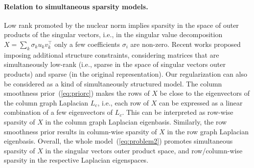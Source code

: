 \documentclass{article}
\begin{document}
\paragraph{Relation to simultaneous sparsity models.}
Low rank promoted by the nuclear norm implies sparsity in the space of outer products of the singular vectors, i.e., in the singular value decomposition $X  =  \sum_{k} \sigma_k u_k v_k^\top$ only a few coefficients $\sigma_i$ are non-zero. Recent works \cite{oymak2012simultaneously} proposed imposing additional structure constraints, considering matrices that are simultaneously low-rank (i.e., sparse in the space of singular vectors outer products) and sparse (in the original representation). Our regularization can also be considered as a kind of simultaneously structured model. The column smoothness prior~(\ref{eq:priorc}) makes the rows of $X$ be close to the eigenvectors of the column graph Laplacian $L_c$, i.e., each row of $X$ can be expressed as a linear combination of a few eigenvectors of $L_c$. This can be interpreted as row-wise sparsity of $X$ in the column graph Laplacian eigenbasis. 
Similarly, the row smoothness prior results in column-wise sparsity of $X$ in the row graph Laplacian eigenbasis. Overall, the whole model~(\ref{eq:problem2}) promotes simultaneous sparsity of $X$ in the singular vectors outer product space, and row/column-wise sparsity in the respective Laplacian eigenspaces. 


































\vspace{-0.05cm}
\end{document}
